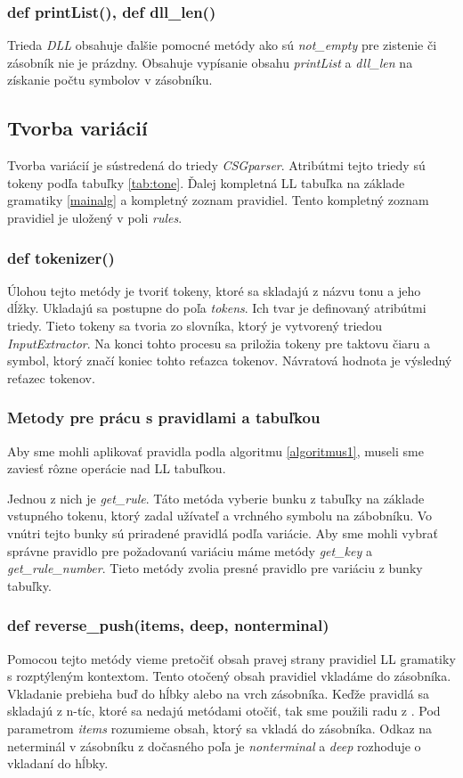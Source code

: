 \subsubsection*{def printList(), def dll\_len()}
Trieda \textit{DLL} obsahuje ďalšie pomocné metódy ako sú \textit{not\_empty} pre zistenie či zásobník nie je prázdny. Obsahuje vypísanie obsahu \textit{printList} a \textit{dll\_len} na získanie počtu symbolov v zásobníku.

\subsection{Tvorba variácií}
Tvorba variácií je sústredená do triedy \textit{CSGparser}. Atribútmi tejto triedy sú tokeny podľa tabuľky \ref{tab:tone}. Ďalej kompletná LL tabuľka na základe gramatiky \ref{mainalg} a kompletný zoznam pravidiel. Tento kompletný zoznam pravidiel je uložený v poli \textit{rules}.

\subsubsection*{def tokenizer()}
Úlohou tejto metódy je tvoriť tokeny, ktoré sa skladajú z názvu tonu a jeho dĺžky. Ukladajú sa postupne do poľa \textit{tokens}. Ich tvar je definovaný atribútmi triedy. Tieto tokeny sa tvoria zo slovníka, ktorý je vytvorený triedou \textit{InputExtractor}. Na konci tohto procesu sa priložia tokeny pre taktovu čiaru a symbol, ktorý značí koniec tohto reťazca tokenov. Návratová hodnota je výsledný reťazec tokenov.

\subsubsection*{Metody pre prácu s pravidlami a tabuľkou}
Aby sme mohli aplikovať pravidla podla algoritmu \ref{algoritmus1}, museli sme zaviesť rôzne operácie nad LL tabuľkou.

Jednou z nich je \textit{get\_rule}. Táto metóda vyberie bunku z tabuľky na základe vstupného tokenu, ktorý zadal užívateľ a vrchného symbolu na zábobníku. Vo vnútri tejto bunky sú priradené pravidlá podľa variácie. Aby sme mohli vybrať správne pravidlo pre požadovanú variáciu máme metódy \textit{get\_key} a \textit{get\_rule\_number}. Tieto metódy zvolia presné pravidlo pre variáciu z bunky tabuľky. 

\subsubsection*{def reverse\_push(items, deep, nonterminal)}
Pomocou tejto metódy vieme pretočiť obsah pravej strany pravidiel LL gramatiky s rozptýleným kontextom. Tento otočený obsah pravidiel vkladáme do zásobníka. Vkladanie prebieha buď do hĺbky alebo na vrch zásobníka. Keďže pravidlá sa skladajú z n-tíc, ktoré sa nedajú metódami otočiť, tak sme použili radu z \cite{stack:site}. Pod parametrom \textit{items} rozumieme obsah, ktorý sa vkladá do zásobníka. Odkaz na neterminál v zásobníku z dočasného poľa je \textit{nonterminal} a \textit{deep} rozhoduje o vkladaní do hĺbky.

